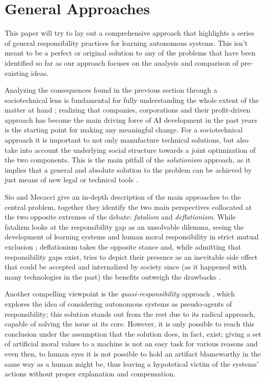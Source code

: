 \section{General Approaches}\label{sec:approaches}

This paper will try to lay out a comprehensive approach that highlights a series of general responsibility practices for learning autonomous systems.
This isn't meant to be a perfect or original solution to any of the problems that have been identified so far as our approach focuses on the analysis and comparison of pre-existing ideas.

Analyzing the consequences found in the previous section through a sociotechnical lens is fundamental for fully un\-der\-stand\-ing the whole extent of the matter at hand \parencite{THETE, NOVAIA}; realizing that companies, corporations and their profit-driven approach has become the main driving force of AI development in the past years is the starting point for making any meaningful change.
For a sociotechnical approach it is important to not only manufacture technical solutions, but also take into account the underlying social structure towards a joint optimization of the two components.
This is the main pitfall of the \textit{solutionism} approach, as it implies that a general and absolute solution to the problem can be achieved by just means of new legal or technical tools \parencite{MORTSE, STILML, SANFRG}.

Sio and Mecacci give an in-depth description of the main approaches to the central problem, together they identify the two main perspectives collocated at the two opposite extremes of the debate: \textit{fatalism} and \textit{deflationism}.
While fatalism looks at the responsibility gap as an unsolvable dilemma, seeing the development of learning systems and human moral responsibility in strict mutual exclusion \parencite{MATTRG}; deflationism takes the opposite stance and, while admitting that responsibility gaps exist, tries to depict their presence as an inevitable side effect that could be accepted and internalized by society since (as it happened with many technologies in the past) the benefits outweigh the drawbacks \parencite{HAYTMP, SIJWA}.

Another compelling viewpoint is the \textit{quasi-responsibility} approach \parencite{STARCA}, which explores the idea of considering autonomous systems as pseudo-agents of responsibility; this solution stands out from the rest due to its radical approach, capable of solving the issue at its core.
However, it is only possible to reach this conclusion under the assumption that the solution does, in fact, exist; giving a set of artificial moral values to a machine is not an easy task for various reasons and even then, to human eyes it is not possible to hold an artifact blameworthy in the same way as a human might be, thus leaving a hypotetical victim of the systems' actions without proper explanation and compensation.